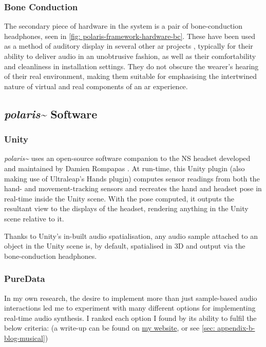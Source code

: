 \subsubsection{Bone Conduction}\label{sec: polaris-framework-hardware-bc}
The secondary piece of hardware in the system is a pair of bone-conduction headphones, seen in \autoref{fig: polaris-framework-hardware-bc}. These have been used as a method of auditory display in several other \ac{ar} projects \citep{lindeman2008,barde2016,chevalier2018}, typically for their ability to deliver audio in an unobtrusive fashion, as well as their comfortability and cleanliness in installation settings. They do not obscure the wearer's hearing of their real environment, making them suitable for emphasising the intertwined nature of virtual and real components of an \ac{ar} experience.


\subsection{\textit{polaris\textasciitilde{}} Software}\label{sec: polaris-framework-software}
\subsubsection{Unity}\label{sec: polaris-framework-software-unity}
\textit{polaris\textasciitilde{}} uses an open-source software companion to the NS headset developed and maintained by Damien Rompapas \citeyearpar{rompapas2020}. At run-time, this Unity plugin (also making use of Ultraleap's Hands plugin) computes sensor readings from both the hand- and movement-tracking sensors and recreates the hand and headset pose in real-time inside the Unity scene. With the pose computed, it outputs the resultant view to the displays of the headset, rendering anything in the Unity scene relative to it.

Thanks to Unity's in-built audio spatialisation, any audio sample attached to an object in the Unity scene is, by default, spatialised in 3D and output via the bone-conduction headphones.

\subsubsection{PureData}\label{sec: polaris-framework-software-puredata}
In my own research, the desire to implement more than just sample-based audio interactions led me to experiment with many different options for implementing real-time audio synthesis. I ranked each option I found by its ability to fulfil the below criteria: (a write-up can be found on \href{https://sambilbow.github.io/projects/polaris/software.html}{my website}, or see \autoref{sec: appendix-b-blog-musical})

